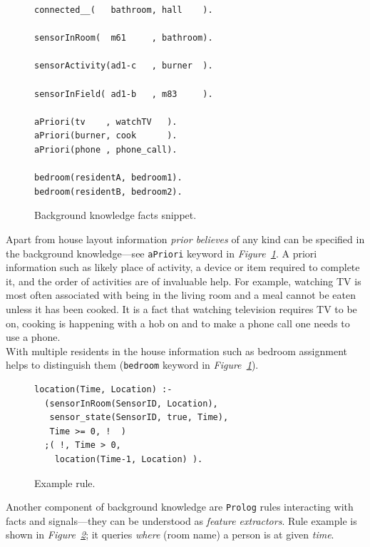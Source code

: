\documentclass[10pt, a4paper, pdflatex, leqno, twoside, openright]{report}
\begin{document}
\begin{figure}[htb] %
  \begin{verbatim}
connected__(   bathroom, hall    ).

sensorInRoom(  m61     , bathroom).

sensorActivity(ad1-c   , burner  ).

sensorInField( ad1-b   , m83     ).

aPriori(tv    , watchTV   ).
aPriori(burner, cook      ).
aPriori(phone , phone_call).

bedroom(residentA, bedroom1).
bedroom(residentB, bedroom2).
  \end{verbatim}
  \caption{Background knowledge facts snippet.\label{lst:bg}}
\end{figure}

Apart from house layout information \emph{prior believes} of any kind can be specified in the background knowledge---see \texttt{aPriori} keyword in \emph{Figure~\ref{lst:bg}}. A priori information such as likely place of activity, a device or item required to complete it, and the order of activities are of invaluable help. For example, watching TV is most often associated with being in the living room and a meal cannot be eaten unless it has been cooked. It is a fact that watching television requires TV to be on, cooking is happening with a hob on and to make a phone call one needs to use a phone.\\
With multiple residents in the house information such as bedroom assignment helps to distinguish them (\texttt{bedroom} keyword in \emph{Figure~\ref{lst:bg}}).\\

\begin{figure}[htb] %
  \begin{verbatim}
location(Time, Location) :-
  (sensorInRoom(SensorID, Location),
   sensor_state(SensorID, true, Time),
   Time >= 0, !  )
  ;( !, Time > 0,
    location(Time-1, Location) ).
  \end{verbatim}
  \caption{Example rule.\label{lst:bg:rule}}
\end{figure}

Another component of background knowledge are \texttt{Prolog} rules interacting with facts and signals---they can be understood as \emph{feature extractors}. Rule example is shown in \emph{Figure~\ref{lst:bg:rule}}; it queries \emph{where} (room name) a person is at given \emph{time}.\\
\end{document}
